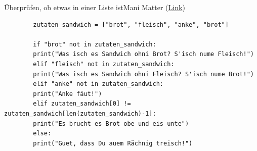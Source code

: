 \begin{frame}[fragile]{Überprüfen, ob etwas in einer Liste ist}{Mani Matter (\href{https://youtu.be/gQbF9Ck1ccc?feature=shared}{Link})}
	
	\begin{lstlisting}
		zutaten_sandwich = ["brot", "fleisch", "anke", "brot"]
		
		if "brot" not in zutaten_sandwich:
		print("Was isch es Sandwich ohni Brot? S'isch nume Fleisch!")
		elif "fleisch" not in zutaten_sandwich:
		print("Was isch es Sandwich ohni Fleisch? S'isch nume Brot!")
		elif "anke" not in zutaten_sandwich:
		print("Anke fäut!")
		elif zutaten_sandwich[0] != zutaten_sandwich[len(zutaten_sandwich)-1]:
		print("Es brucht es Brot obe und eis unte")
		else:
		print("Guet, dass Du auem Rächnig treisch!")
	\end{lstlisting}
\end{frame}